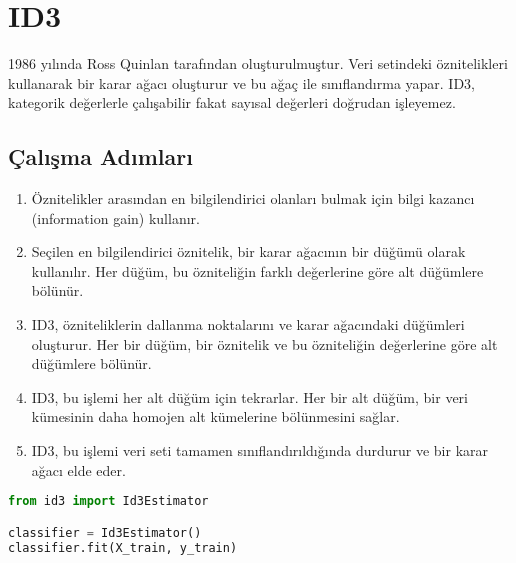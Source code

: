 \section{ID3}
1986 yılında Ross Quinlan tarafından oluşturulmuştur. Veri setindeki öznitelikleri kullanarak bir karar ağacı oluşturur ve bu ağaç ile sınıflandırma yapar. ID3, kategorik değerlerle çalışabilir fakat sayısal değerleri doğrudan işleyemez.

\subsection{Çalışma Adımları}
\begin{enumerate}
    \item Öznitelikler arasından en bilgilendirici olanları bulmak için bilgi kazancı (information gain) kullanır.
    \item Seçilen en bilgilendirici öznitelik, bir karar ağacının bir düğümü olarak kullanılır. Her düğüm, bu özniteliğin farklı değerlerine göre alt düğümlere bölünür.
    \item ID3, özniteliklerin dallanma noktalarını ve karar ağacındaki düğümleri oluşturur. Her bir düğüm, bir öznitelik ve bu özniteliğin değerlerine göre alt düğümlere bölünür.
    \item ID3, bu işlemi her alt düğüm için tekrarlar. Her bir alt düğüm, bir veri kümesinin daha homojen alt kümelerine bölünmesini sağlar.
    \item ID3, bu işlemi veri seti tamamen sınıflandırıldığında durdurur ve bir karar ağacı elde eder.
\end{enumerate}

\begin{lstlisting}[language=Python]
from id3 import Id3Estimator

classifier = Id3Estimator()
classifier.fit(X_train, y_train)
\end{lstlisting}

\newpage

